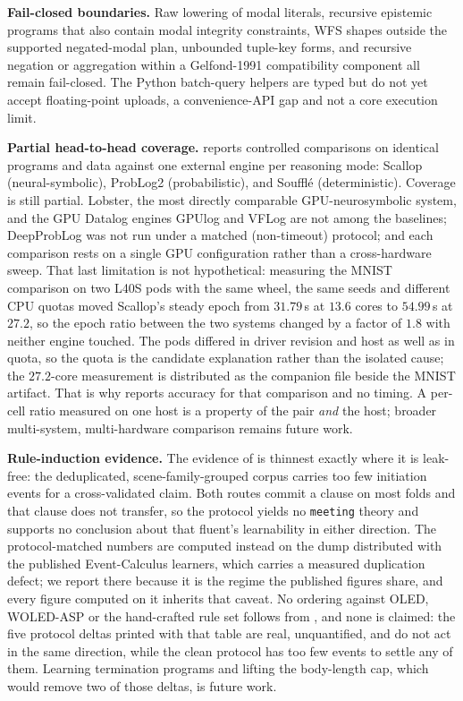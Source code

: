 \textbf{Fail-closed boundaries.} Raw lowering of modal literals, recursive epistemic programs that also contain modal integrity constraints, WFS shapes outside the supported negated-modal plan, unbounded tuple-key forms, and recursive negation or aggregation within a Gelfond-1991 compatibility component all remain fail-closed. The Python batch-query helpers are typed but do not yet accept floating-point uploads, a convenience-API gap and not a core execution limit.

\textbf{Partial head-to-head coverage.}  reports controlled comparisons on identical programs and data against one external engine per reasoning mode: Scallop (neural-symbolic), ProbLog2 (probabilistic), and Soufflé (deterministic). Coverage is still partial. Lobster, the most directly comparable GPU-neurosymbolic system, and the GPU Datalog engines GPUlog and VFLog are not among the baselines; DeepProbLog was not run under a matched (non-timeout) protocol; and each comparison rests on a single GPU configuration rather than a cross-hardware sweep. That last limitation is not hypothetical: measuring the MNIST comparison on two L40S pods with the same wheel, the same seeds and different CPU quotas moved Scallop's steady epoch from $31.79$\,s at $13.6$ cores to $54.99$\,s at $27.2$, so the epoch ratio between the two systems changed by a factor of $1.8$ with neither engine touched. The pods differed in driver revision and host as well as in quota, so the quota is the candidate explanation rather than the isolated cause; the $27.2$-core measurement is distributed as the companion file beside the MNIST artifact. That is why  reports accuracy for that comparison and no timing. A per-cell ratio measured on one host is a property of the pair \emph{and} the host; broader multi-system, multi-hardware comparison remains future work.

\textbf{Rule-induction evidence.} The evidence of  is thinnest exactly where it is leak-free: the deduplicated, scene-family-grouped corpus carries too few initiation events for a cross-validated claim. Both routes commit a clause on most folds and that clause does not transfer, so the protocol yields no \texttt{meeting} theory and supports no conclusion about that fluent's learnability in either direction. The protocol-matched numbers are computed instead on the dump distributed with the published Event-Calculus learners, which carries a measured duplication defect; we report there because it is the regime the published figures share, and every figure computed on it inherits that caveat. No ordering against OLED, WOLED-ASP or the hand-crafted rule set follows from , and none is claimed: the five protocol deltas printed with that table are real, unquantified, and do not act in the same direction, while the clean protocol has too few events to settle any of them. Learning termination programs and lifting the body-length cap, which would remove two of those deltas, is future work.

